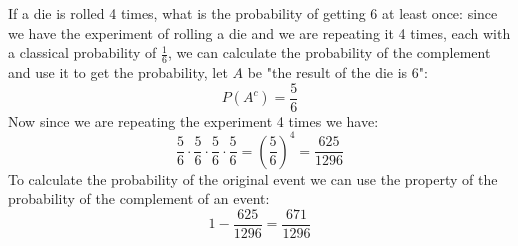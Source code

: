 \documentclass{article}
\begin{document}
    \begin{minipage}{\linewidth}
        \begin{solutions}
            If a die is rolled 4 times, what is the probability of getting 6 at least once: since we have the experiment of rolling a die and we are repeating it 4 times, each with a classical probability of $\frac{1}{6}$, we can calculate the probability of the complement and use it to get the probability, let $A$ be "the result of the die is 6":
            \[
                P(A^c) = \frac{5}{6} 
            \]
            Now since we are repeating the experiment 4 times we have: 
            \[
                \frac{5}{6}  \cdot \frac{5}{6} \cdot \frac{5}{6} \cdot \frac{5}{6} = (\frac{5}{6})^{4} = \frac{625}{1296}
            \]
            To calculate the probability of the original event we can use the property of the probability of the complement of an event:
            \[
                1 - \frac{625}{1296} = \frac{671}{1296}
            \]
            \medskip
        \end{solutions}   
    \end{minipage}
\end{document}
